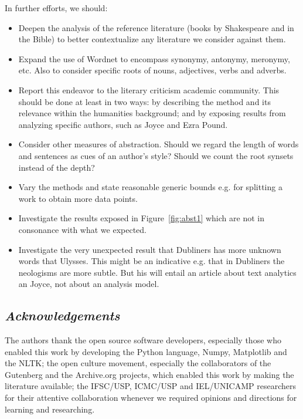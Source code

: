 \documentclass[12pt,fleqn]{article}
\begin{document}
In further efforts, we should:
\begin{itemize}
    \item Deepen the analysis of the reference literature (books by Shakespeare and in the Bible)
        to better contextualize any literature we consider against them.
    \item Expand the use of Wordnet to encompass synonymy, antonymy, meronymy, etc.
        Also to consider specific roots of nouns, adjectives, verbs and adverbs.
    \item Report this endeavor to the literary criticism academic community.
        This should be done at least in two ways: by describing the method and its relevance
        within the humanities background;
        and by exposing results from analyzing specific authors, such as Joyce and Ezra Pound.
    \item Consider other measures of abstraction.
	    Should we regard the length of words and sentences as cues of an author's style?
        Should we count the root synsets instead of the depth?
    \item Vary the methods and state reasonable generic bounds e.g. for splitting a work to
        obtain more data points.
    \item Investigate the results exposed in Figure~\ref{fig:abst1} which are not in consonance with what we expected.
    \item Investigate the very unexpected result that Dubliners has more unknown words that Ulysses.
	    This might be an indicative e.g. that in Dubliners the neologisms are more subtle.
		But his will entail an article about text analytics an Joyce, not about an analysis model.
\end{itemize}

\subsection*{\textit{Acknowledgements}}
The authors thank the open source software developers,
especially those who enabled this work by developing
the Python language, Numpy, Matplotlib and the NLTK;
the open culture movement, especially the collaborators
of the Gutenberg and the Archive.org projects, which
enabled this work by making the literature available;
the IFSC/USP, ICMC/USP and IEL/UNICAMP researchers for their attentive
collaboration whenever we required opinions and directions for learning and researching.
\end{document}
